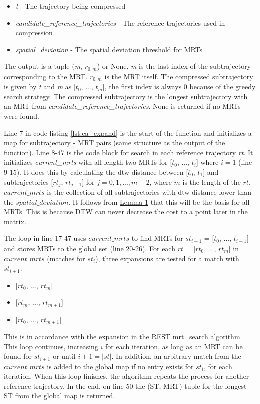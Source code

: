 

\begin{itemize}
    \item{\textit{t} - The trajectory being compressed}
    \item{\textit{candidate\_reference\_trajectories} - The reference trajectories used in compression}
    \item{\textit{spatial\_deviation} - The spatial deviation threshold for MRTs}
\end{itemize}

The output is a tuple (\textit{m}, $r_{0,m}$) or None. \textit{m} is the last index of the subtrajectory corresponding to the MRT. $r_{0,m}$ is the MRT itself. The compressed subtrajectory is given by \textit{t} and \textit{m} as [$t_0$, ..., $t_m$], the first index is always 0 because of the greedy search strategy. The compressed subtrajectory is the longest subtrajectory with an MRT from \textit{candidate\_reference\_trajectories}. None is returned if no MRTs were found.

Line 7 in code listing \ref{lst:ca_expand} is the start of the function and initializes a map for subtrajectory - MRT pairs (same structure as the output of the function). Line 8-47 is the code block for search in each reference trajectory \textit{rt}. It initializes \textit{current\_mrts} with all length two MRTs for [$t_0$, ..., $t_i$] where $i = 1$ (line 9-15). It does this by calculating the dtw distance between [$t_0$, $t_1$] and subtrajectories [$rt_j$, $rt_{j+1}$] for $j = 0, 1, ..., m-2$, where $m$ is the length of the $rt$. $current\_mrts$ is the collection of all subtrajectories with dtw distance lower than the $spatial\_deviation$. It follows from \hyperref[lemma]{Lemma 1} that this will be the basis for all MRTs. This is because DTW can never decrease the cost to a point later in the matrix.

The loop in line 17-47 uses $current\_mrts$ to find MRTs for $st_{i+1}$ = [$t_0$, ..., $t_{i+1}$] and stores MRTs to the global set (line 20-26). For each $rt$ = [$rt_0$, ..., $rt_m$] in $current\_mrts$ (matches for $st_i$), three expansions are tested for a match with $st_{i+1}$:
\begin{itemize}
    \item {[$rt_0$, ..., $rt_m$]}
    \item {[$rt_m$, ..., $rt_{m+1}$]}
    \item {[$rt_0$, ..., $rt_{m+1}$]}
\end{itemize}
This is in accordance with the expansion in the REST mrt\_search algorithm. This loop continues, increasing $i$ for each iteration, as long as an MRT can be found for $st_{i+1}$ or until $i+1 = |st|$. In addition, an arbitrary match from the $current\_mrts$ is added to the global map if no entry exists for $st_{i}$, for each iteration. When this loop finishes, the algorithm repeats the process for another reference trajectory. In the end, on line 50 the (ST, MRT) tuple for the longest ST from the global map is returned.

